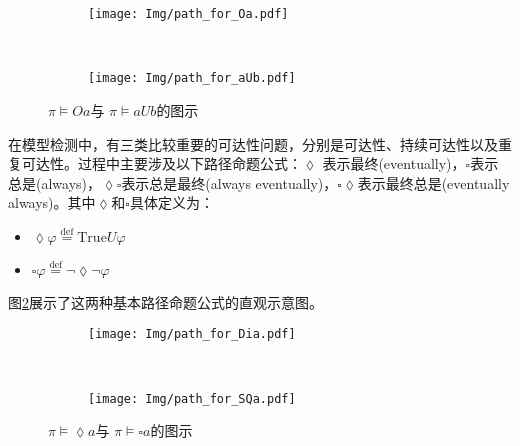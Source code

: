 \begin{figure}[!htbp]
    \centering
    \begin{subfigure}[b]{0.8\textwidth}
        \centering
        \texttt{[image: Img/path\_for\_Oa.pdf]}
    \end{subfigure}
    \\
    \begin{subfigure}{0.8\textwidth}
        \centering
        \texttt{[image: Img/path\_for\_aUb.pdf]}
    \end{subfigure}
    \caption{$\pi\models O a $与 $\pi\models a U b$的图示}
    \label{fig:path-formula-basic}
\end{figure}
在模型检测中，有三类比较重要的可达性问题，分别是可达性、持续可达性以及重复可达性。过程中主要涉及以下路径命题公式：\(\lozenge\) 表示最终(eventually)，\(\square\)表示总是(always)，\(\lozenge\square\)表示总是最终(always eventually)，\(\square\lozenge\)表示最终总是(eventually always)。其中\(\lozenge\)和\(\square\)具体定义为：
\begin{itemize}
    \item \(\lozenge\varphi\overset{\text{def} }{=} \text{True}U\varphi\)
    \item \(\square\varphi\overset{\text{def} }{=} \neg\lozenge\neg\varphi\)
\end{itemize}
图\ref{fig:path-formula}展示了这两种基本路径命题公式的直观示意图。
\begin{figure}[!htbp]
    \centering
    \begin{subfigure}[b]{0.8\textwidth}
        \centering
        \texttt{[image: Img/path\_for\_Dia.pdf]}
    \end{subfigure}
    \\
    \begin{subfigure}{0.8\textwidth}
        \centering
        \texttt{[image: Img/path\_for\_SQa.pdf]}
    \end{subfigure}
    \caption{$\pi\models\lozenge a$与 $\pi\models\square a$的图示}
    \label{fig:path-formula}
\end{figure}


